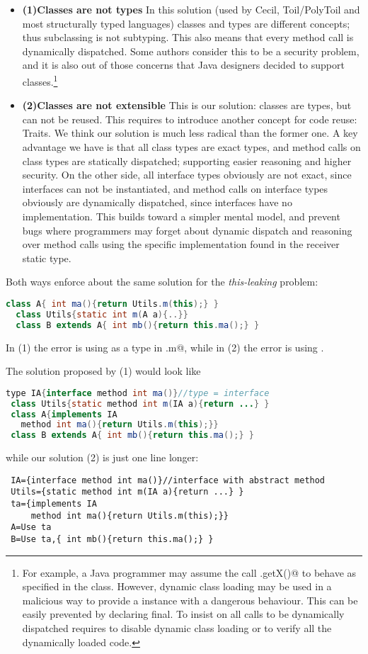 \begin{itemize}
\item \textbf{(1)Classes are not types}
In this solution (used by Cecil, Toil/PolyToil and most structurally typed languages) classes and types are different concepts; thus subclassing is not subtyping.
This also means that every method call is dynamically dispatched. Some authors consider this to be a security problem, and it is also out of those concerns that Java designers decided to support \Q@final@ classes.\footnote{
For example, a Java programmer may assume the call \Q@myPoint.getX()@ to behave as specified in the \Q@Point@ class. However, dynamic class loading may be used in a malicious way to provide a \Q@Point@ instance with a
dangerous behaviour. This can be easily prevented by declaring \Q@Point@ final. To insist on all calls to be dynamically dispatched requires to disable dynamic class loading or to verify all the dynamically loaded code.}
\item \textbf{(2)Classes are not extensible}
This is our solution: classes are types, but can not be reused. This requires to introduce another concept for code reuse: Traits.
We think our solution is much less radical than the former one.
A key advantage we have is that all class types are exact types, and method calls on class types are statically dispatched; supporting easier reasoning and higher security.
On the other side, all interface types obviously are not exact, since interfaces can not be instantiated,
and method calls on interface types obviously are dynamically dispatched, since interfaces have no implementation.
This builds toward a simpler mental model, and prevent bugs where programmers may forget about dynamic dispatch and reasoning over method calls using the specific implementation found in the receiver static type.
\end{itemize}

Both ways enforce about the same solution for the \emph{this-leaking} problem:
\begin{lstlisting}[language=Java]
  class A{ int ma(){return Utils.m(this);} }
  class Utils{static int m(A a){..}}
  class B extends A{ int mb(){return this.ma();} }  
\end{lstlisting}
In (1) the error is using \Q@A@ as a type in \Q@Utils.m@,
while in (2) the error is using \Q@extends@.

The solution proposed by (1) would look like
\begin{lstlisting}[language=Java, morekeywords={type, method}]
 type IA{interface method int ma()}//type = interface
 class Utils{static method int m(IA a){return ...} }
 class A{implements IA 
   method int ma(){return Utils.m(this);}}
 class B extends A{ int mb(){return this.ma();} }  
\end{lstlisting}
while our solution (2) is just one line longer:
\begin{lstlisting}
 IA={interface method int ma()}//interface with abstract method
 Utils={static method int m(IA a){return ...} }
 ta={implements IA
     method int ma(){return Utils.m(this);}}
 A=Use ta
 B=Use ta,{ int mb(){return this.ma();} }  
\end{lstlisting}


